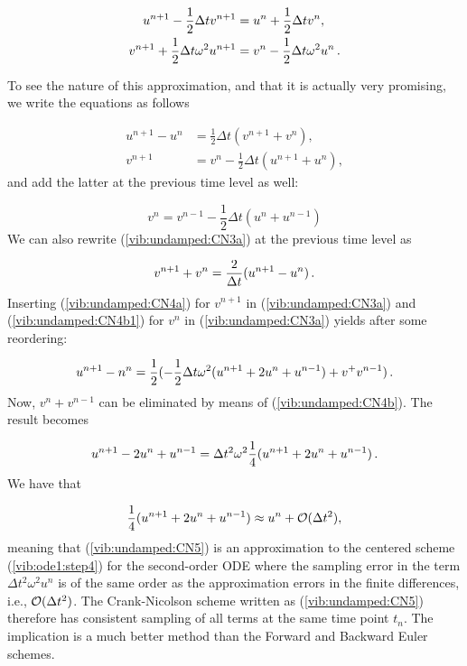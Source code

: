\documentclass[%
oneside,                 %
final,                   %
10pt]{article}
\begin{document}
\begin{align}
u^{n+1} - \half\Delta t v^{n+1} &= u^{n} + \half\Delta t v^{n},\\ 
v^{n+1} + \half\Delta t \omega^2 u^{n+1} &= v^{n}
- \half\Delta t \omega^2 u^{n}
\tp
\end{align}

To see the nature of this approximation, and that it is actually
very promising, we write the equations as follows

\begin{align}
u^{n+1} - u^n &= \frac{1}{2}\Delta t(v^{n+1} + v^n),
\label{vib:undamped:CN3a}\\ 
v^{n+1}  &= v^n -\frac{1}{2}\Delta t(u^{n+1} + u^n),
\label{vib:undamped:CN4a}
\end{align}
and add the latter at the previous time level as well:

\begin{equation}
v^{n}  = v^{n-1} -\frac{1}{2}\Delta t(u^{n} + u^{n-1})
\label{vib:undamped:CN4b1}
\end{equation}
We can also rewrite (\ref{vib:undamped:CN3a}) at the previous time level
as

\begin{equation}
v^{n+1} + v^n = \frac{2}{\Delta t}(u^{n+1} - u^n)\tp
\label{vib:undamped:CN4b}
\end{equation}
Inserting (\ref{vib:undamped:CN4a}) for $v^{n+1}$ in
(\ref{vib:undamped:CN3a}) and
(\ref{vib:undamped:CN4b1}) for $v^{n}$ in
(\ref{vib:undamped:CN3a}) yields after some reordering:

\[ u^{n+1} - n^n = \frac{1}{2}(-\frac{1}{2}\Delta t\omega^2
(u^{n+1} + 2u^n + u^{n-1}) + v^ + v^{n-1})\tp\]
Now, $v^n + v^{n-1}$ can be eliminated by means of
(\ref{vib:undamped:CN4b}). The result becomes

\begin{equation}
u^{n+1} - 2u^n + u^{n-1} = \Delta t^2\omega^2
\frac{1}{4}(u^{n+1} + 2u^n + u^{n-1})\tp
\label{vib:undamped:CN5}
\end{equation}
We have that

\[ \frac{1}{4}(u^{n+1} + 2u^n + u^{n-1}) \approx u^n + \Oof{\Delta t^2},\]
meaning that (\ref{vib:undamped:CN5}) is an approximation to
the centered scheme (\ref{vib:ode1:step4}) for the second-order ODE where
the sampling error in the term $\Delta t^2\omega^2 u^n$ is of the same
order as the approximation errors in the finite differences, i.e.,
$\Oof{\Delta t^2}$. The Crank-Nicolson scheme written as
(\ref{vib:undamped:CN5}) therefore has consistent sampling of all
terms at the same time point $t_n$. The implication is a much better
method than the Forward and Backward Euler schemes.
\end{document}
